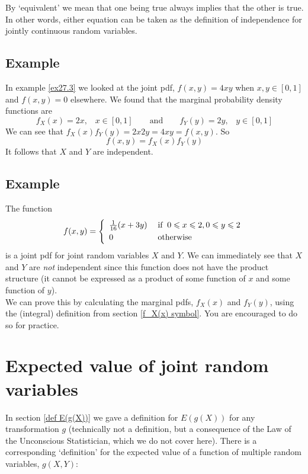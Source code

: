   	\bigskip
	
	\hfil{}
	\bigskip
	\bigskip

\noindent By `equivalent' we mean that one being true always implies that the other is true. In other words, either equation can be taken as the definition of independence for jointly continuous random variables.

\subsection{Example}
In example \ref{ex27.3} we looked at the joint pdf, $f(x,y) = 4xy$ when $x,y \in [0,1]$ and $f(x,y) = 0$ elsewhere. We found that the marginal probability density functions are
\[
f_X(x) = 2x, \;\;\; x \in [0,1] \qquad \text{and} \qquad f_Y(y) = 2y, \;\;\; y \in [0,1]
\]
We can see that $f_X(x)f_Y(y) = 2x2y = 4xy = f(x,y)$. So
\[
f(x,y) = f_X(x)f_Y(y)
\]
It follows that $X$ and $Y$ are independent.

\subsection{Example}
The function
\[
f(x,y) = \left\{ \begin{array}{ll}
\frac{1}{16}(x + 3y) & \; \text{if} \;\; 0 \leq x \leq 2, 0 \leq y \leq 2 \smallskip \\
0 & \; \text{otherwise}
\end{array}
\right.
\]
is a joint pdf for joint random variables $X$ and $Y$. We can immediately see that $X$ and $Y$ are \textit{not} independent since this function does not have the product structure (it cannot be expressed as a product of some function of $x$ and some function of $y$). \\

\noindent We can prove this by calculating the marginal pdfs, $f_X(x)$ and $f_Y(y)$, using the (integral) definition from section \ref{f_X(x) symbol}. You are encouraged to do so for practice.

\section{Expected value of joint random variables} \label{def E(g(X,Y))}
In section \ref{def E(g(X))} we gave a definition for $E(g(X))$ for any transformation $g$ (technically not a definition, but a consequence of the Law of the Unconscious Statistician, which we do not cover here). There is a corresponding `definition' for the expected value of a function of multiple random variables, $g(X,Y)$: \\

